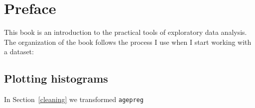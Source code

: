 \documentclass[12pt]{book}
\begin{document}
\chapter{Preface}%
\label{preface}

This book is an introduction to the practical tools of exploratory data analysis.  The
organization of the book follows the process I use when I start working with a dataset:

\section{Plotting histograms}%

In Section~\ref{cleaning} we transformed \verb"agepreg"
\end{document}
